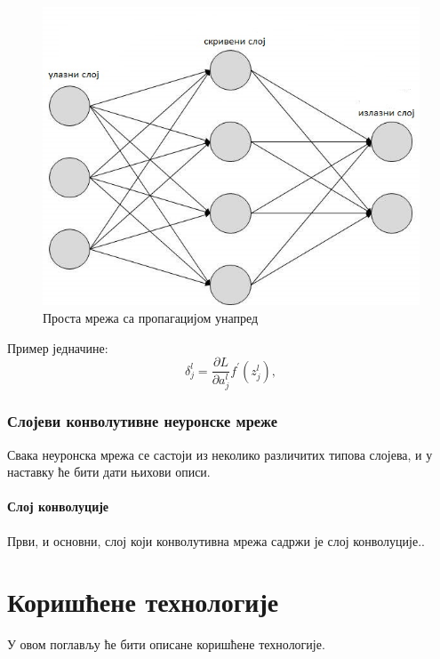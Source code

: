 \documentclass[a4paper, 12pt, master, utf8]{etf}
\begin{document}
\begin{figure}[h]
    \centering
    \includegraphics[width=.6\textwidth]{img/simple_net.jpg}
    \caption{Проста мрежа са пропагацијом унапред}
    \label{fig:simplenet}
\end{figure}

Пример једначине:
\begin{equation}
\label{2.1}
        \delta_j^l = \frac{\partial L}{\partial a_j^l}f^\prime(z_j^l),
\end{equation}

\subsection{Слојеви конволутивне неуронске мреже}
\label{sec:24}
Свака неуронска мрежа се састоји из неколико различитих типова слојева, и у наставку ће бити дати њихови описи.

\subsubsection{Слој конволуције}
Први, и основни, слој који конволутивна мрежа садржи је слој конволуције..

\chapter{Коришћене технологије}
\label{sec:3}
У овом поглављу ће бити описане коришћене технологије.
\end{document}
